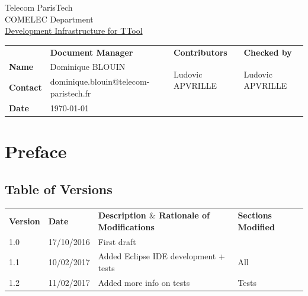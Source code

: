 \documentclass[12pt]{article}
\begin{document}
\sloppy 

\begin{center}
\Large Telecom ParisTech \\
\Large COMELEC Department \\
\vspace{20 pt}
\underline{\Huge Development Infrastructure for TTool}
\end{center}

\begin{table}[H]
\large
\centering
\begin{adjustbox}{width=\textwidth}
\begin{tabular}{ |p{1.6cm}|p{6.0cm}|p{4.2cm}|p{4.2cm}| }
\hhline{----}
 & \textbf{Document Manager} & \textbf{Contributors}  & \textbf{Checked by}  \\ 
\hhline{----}
\textbf{Name}   & Dominique BLOUIN & \multirow{2}{*}{Ludovic APVRILLE} &
\multirow{2}{*}{Ludovic APVRILLE} \\
\hhline{--~~}
\textbf{Contact} & dominique.blouin@telecom-paristech.fr &  &  \\ 
\hhline{--~~}
\textbf{Date} & \today &  &  \\ 
\hline
\end{tabular}
\end{adjustbox}
\end{table}

\newpage
\tableofcontents


\newpage
\section{Preface}

\subsection{Table of Versions}

\begin{table}[H]
\large
\centering
\begin{adjustbox}{width=\textwidth}
\begin{tabular}{ |p{1.5cm}|p{2.5cm}|p{9.0cm}|p{3.0cm}| }
\hhline{----}
\textbf{Version} & \textbf{Date} & \textbf{Description  $  \&  $  Rationale of
Modifications} & \textbf{Sections Modified} \\
\hhline{----}
1.0 & 17/10/2016 & First draft &  \\ 
1.1 & 10/02/2017 & Added Eclipse IDE development + tests & All \\ 
1.2 & 11/02/2017 & Added more info on tests & Tests \\ 
\hline
\end{tabular}
\end{adjustbox}
\end{table}
\end{document}
